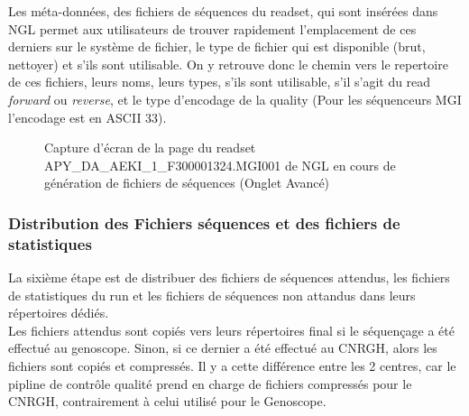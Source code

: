 Les méta-données, des fichiers de séquences du readset, qui sont insérées dans NGL permet aux utilisateurs de trouver rapidement l'emplacement de ces derniers sur le système de fichier, le type de fichier qui est disponible (brut, nettoyer) et s'ils sont utilisable.
On y retrouve donc le chemin vers le repertoire de ces fichiers, leurs noms, leurs types, s'ils sont utilisable, s'il s'agit du read \emph{forward} ou \emph{reverse}, et le type d'encodage de la quality (Pour les séquenceurs MGI l'encodage est en ASCII 33).

\begin{figure}[H]
    \centering
    \caption{\footnotesize{Capture d'écran de la page du readset APY\_DA\_AEKI\_1\_F300001324.MGI001 de NGL en cours de génération de fichiers de séquences (Onglet \og Avancé\fg{})}}
    \label{meta-data-fastq}
\end{figure}

\subsubsection*{Distribution des Fichiers séquences et des fichiers de statistiques}
La sixième étape est de distribuer des fichiers de séquences \og attendus\fg{}, les fichiers de statistiques du run et les fichiers de séquences \og non attandus\fg{} dans leurs répertoires dédiés.\\

Les fichiers attendus sont copiés vers leurs répertoires final si le séquençage a été effectué au genoscope.
Sinon, si ce dernier a été effectué au CNRGH, alors les fichiers sont copiés et compressés.
Il y a cette différence entre les 2 centres, car le pipline de contrôle qualité prend en charge de fichiers compressés pour le CNRGH, contrairement à celui utilisé pour le Genoscope.\\

